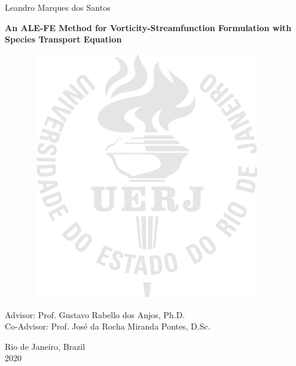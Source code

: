\begin{center}

{\large Leandro Marques dos Santos}

\vspace{2cm}

\textbf{\LARGE An ALE-FE Method for Vorticity-Streamfunction Formulation with Species Transport Equation}

\vspace{1.0cm}

\begin{figure}[hbt!]
\begin{center}
\includegraphics[width=10.48cm,height=10.8cm]{logos/logo_uerj_mark}
\end{center}
\end{figure}

\vspace{-9cm}
\begin{flushright}
\parbox{8cm}{
}
\end{flushright}

\vspace{4.0cm}

{\large Advisor: Prof. Gustavo Rabello dos Anjos, Ph.D.\\
        Co-Advisor: Prof. José da Rocha Miranda Pontes, D.Sc.}\\

\par\vfill

{\large Rio de Janeiro, Brazil\\2020}

\end{center}
